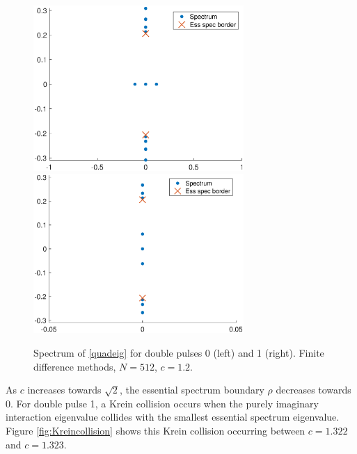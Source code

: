\documentclass[12pt]{article}
\begin{document}
\begin{figure}[H]
\centering
\includegraphics[width=8cm]{spec12_double1.eps}
\includegraphics[width=8cm]{spec12_double2.eps}
\caption{Spectrum of \eqref{quadeig} for double pulses 0 (left) and 1 (right). Finite difference methods, $N = 512$, $c = 1.2$.}
\label{fig:quadeigdouble}
\end{figure}

As $c$ increases towards $\sqrt{2}$, the essential spectrum boundary $\rho$ decreases towards 0. For double pulse 1, a Krein collision occurs when the purely imaginary interaction eigenvalue collides with the smallest essential spectrum eigenvalue. Figure \ref{fig:Kreincollision} shows this Krein collision occurring between $c = 1.322$ and $c = 1.323$.
\end{document}
